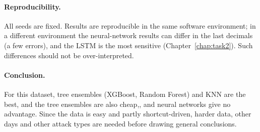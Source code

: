 \paragraph{Reproducibility.} All seeds are fixed. Results are reproducible in the same software environment; in a different environment the neural-network results can differ in the last decimals (a few errors), and the LSTM is the most sensitive (Chapter~\ref{chap:task2}). Such differences should not be over-interpreted.

\paragraph{Conclusion.} For this dataset, tree ensembles (XGBoost, Random Forest) and KNN are the best, and the tree ensembles are also cheap,, and neural networks give no advantage. Since the data is easy and partly shortcut-driven, harder data, other days and other attack types are needed before drawing general conclusions.
